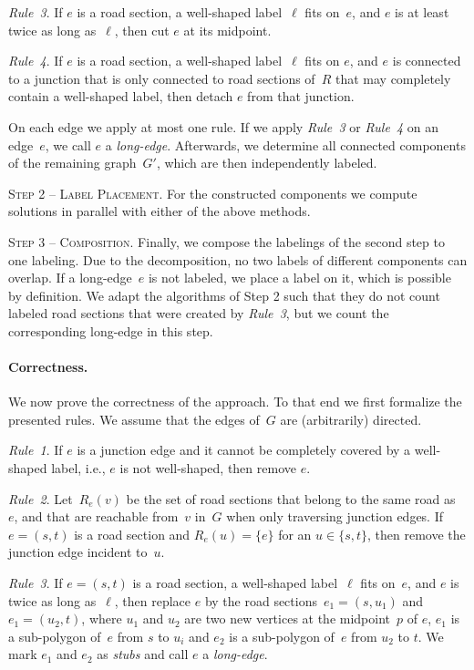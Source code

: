 \documentclass[a4paper,11pt]{article}
\newcommand{\RuleA}{\textit{Rule~1}\xspace}
\newcommand{\RuleB}{\textit{Rule~2}\xspace}
\newcommand{\RuleC}{\textit{Rule~3}\xspace}
\newcommand{\RuleD}{\textit{Rule~4}\xspace}
\begin{document}
\RuleC. If $e$ is a road section, a well-shaped label~$\ell$
fits on~$e$, and $e$ is at least twice as long as~$\ell$, then cut $e$ at its
midpoint. 


\RuleD. If $e$ is a road section, a well-shaped label~$\ell$ fits on $e$, and
$e$ is connected to a junction that is only connected to road sections
of~$R$ that may completely contain a well-shaped label, then detach $e$ from that junction.













On each edge we apply at most one rule. If we apply
\RuleC or \RuleD on an edge~$e$, we call $e$ a \emph{long-edge}. Afterwards, we determine all connected components
of the remaining graph~$G'$, which are then independently labeled. 

\textsc{Step 2 -- Label Placement.} For the constructed components we compute solutions in parallel with either of the above methods.




\textsc{Step 3 -- Composition.} Finally, we compose the labelings of
the second step to one labeling. Due to the decomposition, no two
labels of different components can overlap. If a long-edge~$e$ is not
labeled, we place a label on it, which is possible by definition.  We
adapt the algorithms of Step 2 such that they do not count labeled
road sections that were created by \RuleC, but we count the
corresponding long-edge in this step.

\paragraph{Correctness.} We now prove the correctness of the
approach. To that end we first formalize the presented rules. We
assume that the edges of~$G$ are (arbitrarily)
directed. 

\RuleA. If $e$ is a junction edge and it cannot be completely covered
by a well-shaped label, i.e., $e$ is not well-shaped, then remove $e$.

\RuleB. Let~$R_e(v)$ be the set of road sections that belong to the
same road as~$e$, and that are reachable from~$v$ in~$G$ when only
traversing junction edges. If $e=(s,t)$ is a road section and
$R_e(u)=\{e\}$ for an $u\in\{s,t\}$, then remove the junction edge incident
to~$u$.

\RuleC. If $e=(s,t)$ is a road section, a well-shaped label~$\ell$
fits on~$e$, and $e$ is twice as long as~$\ell$, then replace $e$ by
the road sections~$e_1=(s,u_1)$ and $e_1=(u_2,t)$, where $u_1$ and
$u_2$ are two new vertices at the midpoint~$p$ of $e$, $e_1$ is a sub-polygon of~$e$ from
$s$ to $u_i$ and $e_2$ is a sub-polygon of~$e$ from $u_2$ to $t$. We
mark $e_1$ and $e_2$ as \emph{stubs} and call $e$ a \emph{long-edge}.
\end{document}
